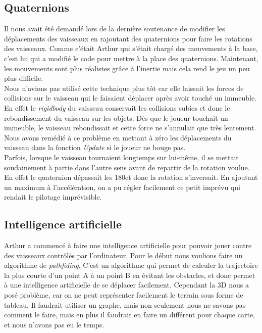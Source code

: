 \documentclass[10pt, titlepage]{report}
\begin{document}
\subsection{Quaternions}
Il nous avait été demandé lors de la dernière soutenance de modifier les déplacements des vaisseaux en rajoutant des quaternions pour faire les rotations des vaisseaux. Comme c'était Arthur qui s'était chargé des mouvements à la base, c'est lui qui a modifié le code pour mettre à la place des quaternions. Maintenant, les mouvements sont plus réalistes grâce à l'inertie mais cela rend le jeu un peu plus difficile.\\

Nous n'avions pas utilisé cette technique plus tôt car elle laissait les forces de collisions sur le vaisseau qui le faisaient déplacer après avoir touché un immeuble. En effet le \textit{rigidbody} du vaisseau conservait les collisions subies et donc le rebondissement du vaisseau sur les objets. Dès que le joueur touchait un immeuble, le vaisseau rebondissait et cette force ne s'annulait que très lentement. Nous avons remédié à ce problème en mettant à zéro les déplacements du vaisseau dans la fonction \textit{Update} si le joueur ne bouge pas.\\

Parfois, lorsque le vaisseau tournaient longtemps sur lui-même, il se mettait soudainement à partie dans l'autre sens avant de repartir de la rotation voulue. En effet le quaternion dépassait les 180\textdegree  et donc la rotation s'inversait. En ajoutant un maximum à l'accélération, on a pu régler facilement ce petit imprévu qui rendait le pilotage imprévisible.\\

\subsection{Intelligence artificielle}

Arthur a commencé à faire une intelligence artificielle pour pouvoir jouer contre des vaisseaux contrôlés par l'ordinateur. Pour le début nous voulions faire un algorithme de \textit{pathfiding}. C'est un algorithme qui permet de calculer la trajectoire la plus courte d'un point A à un point B en évitant les obstacles, et donc permet à une intelligence artificielle de se déplacer facilement. Cependant la 3D nous a posé problème, car on ne peut représenter facilement le terrain sous forme de tableau. Il faudrait utiliser un graphe, mais non seulement nous ne savons pas comment le faire, mais en plus il faudrait en faire un différent pour chaque carte, et nous n'avons pas eu le temps.\\
\end{document}

